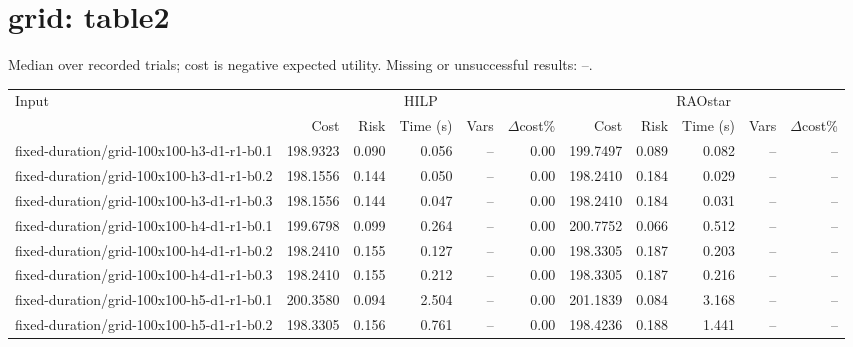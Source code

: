 \documentclass[10pt]{article}
\begin{document}
\section*{grid: table2}
\noindent Median over recorded trials; cost is negative expected utility. Missing or unsuccessful results: --.\par
\small\begin{tabular}{p{65mm}rrrrrrrrrr}
\toprule
Input & \multicolumn{5}{c}{HILP} & \multicolumn{5}{c}{RAOstar} \\
 & Cost & Risk & Time (s) & Vars & $\Delta$cost\% & Cost & Risk & Time (s) & Vars & $\Delta$cost\% \\
\midrule
fixed-\allowbreak duration/\allowbreak grid-\allowbreak 100x100-\allowbreak h3-\allowbreak d1-\allowbreak r1-\allowbreak b0.1 & 198.9323 & 0.090 & 0.056 & -- & 0.00 & 199.7497 & 0.089 & 0.082 & -- & -- \\
fixed-\allowbreak duration/\allowbreak grid-\allowbreak 100x100-\allowbreak h3-\allowbreak d1-\allowbreak r1-\allowbreak b0.2 & 198.1556 & 0.144 & 0.050 & -- & 0.00 & 198.2410 & 0.184 & 0.029 & -- & -- \\
fixed-\allowbreak duration/\allowbreak grid-\allowbreak 100x100-\allowbreak h3-\allowbreak d1-\allowbreak r1-\allowbreak b0.3 & 198.1556 & 0.144 & 0.047 & -- & 0.00 & 198.2410 & 0.184 & 0.031 & -- & -- \\
fixed-\allowbreak duration/\allowbreak grid-\allowbreak 100x100-\allowbreak h4-\allowbreak d1-\allowbreak r1-\allowbreak b0.1 & 199.6798 & 0.099 & 0.264 & -- & 0.00 & 200.7752 & 0.066 & 0.512 & -- & -- \\
fixed-\allowbreak duration/\allowbreak grid-\allowbreak 100x100-\allowbreak h4-\allowbreak d1-\allowbreak r1-\allowbreak b0.2 & 198.2410 & 0.155 & 0.127 & -- & 0.00 & 198.3305 & 0.187 & 0.203 & -- & -- \\
fixed-\allowbreak duration/\allowbreak grid-\allowbreak 100x100-\allowbreak h4-\allowbreak d1-\allowbreak r1-\allowbreak b0.3 & 198.2410 & 0.155 & 0.212 & -- & 0.00 & 198.3305 & 0.187 & 0.216 & -- & -- \\
fixed-\allowbreak duration/\allowbreak grid-\allowbreak 100x100-\allowbreak h5-\allowbreak d1-\allowbreak r1-\allowbreak b0.1 & 200.3580 & 0.094 & 2.504 & -- & 0.00 & 201.1839 & 0.084 & 3.168 & -- & -- \\
fixed-\allowbreak duration/\allowbreak grid-\allowbreak 100x100-\allowbreak h5-\allowbreak d1-\allowbreak r1-\allowbreak b0.2 & 198.3305 & 0.156 & 0.761 & -- & 0.00 & 198.4236 & 0.188 & 1.441 & -- & -- \\

\end{tabular}
\end{document}
